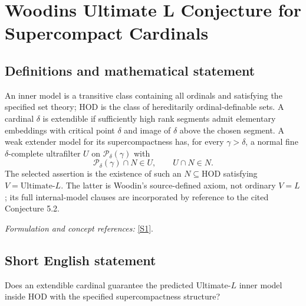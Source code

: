 \documentclass[11pt]{article}
\begin{document}
\section*{\texorpdfstring{Woodins Ultimate L Conjecture for Supercompact Cardinals}{Woodins Ultimate L Conjecture for Supercompact Cardinals}}\label{30006711}
\subsection{Definitions and mathematical statement}
An inner model is a transitive class containing all ordinals and satisfying the specified set theory; $\mathrm{HOD}$ is the class of hereditarily ordinal-definable sets. A cardinal $\delta$ is extendible if sufficiently high rank segments admit elementary embeddings with critical point $\delta$ and image of $\delta$ above the chosen segment. A weak extender model for its supercompactness has, for every $\gamma>\delta$, a normal fine $\delta$-complete ultrafilter $U$ on $\mathcal P_\delta(\gamma)$ with
\[
 \mathcal P_\delta(\gamma)\cap N\in U,\qquad U\cap N\in N.
\]
The selected assertion is the existence of such an $N\subseteq\mathrm{HOD}$ satisfying $V=\mathrm{Ultimate}\text{-}L$. The latter is Woodin's source-defined axiom, not ordinary $V=L$; its full internal-model clauses are incorporated by reference to the cited Conjecture 5.2.
\par\smallskip\textit{Formulation and concept references:} \href{https://www.cambridge.org/core/journals/review-of-symbolic-logic/article/steels-programme-evidential-framework-the-core-and-ultimatel/22BC5068C2DC48CC899C60E1445A7792}{[S1]}.

\subsection{Short English statement}
Does an extendible cardinal guarantee the predicted Ultimate-$L$ inner model inside HOD with the specified supercompactness structure?
\end{document}
